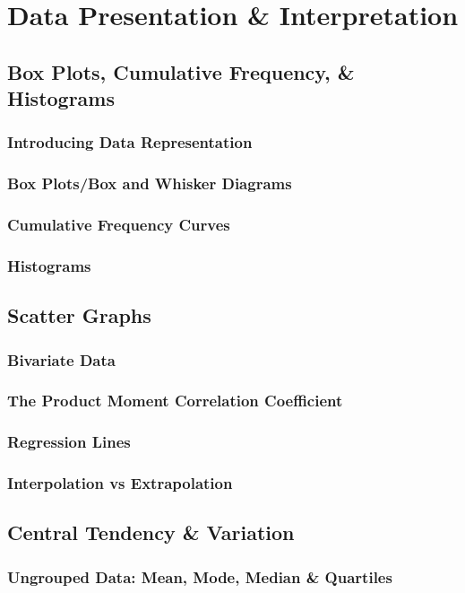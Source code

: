 \documentclass[../maths.tex]{subfiles}
\begin{document}
\chapter{Data Presentation \& Interpretation}
\section{Box Plots, Cumulative Frequency, \& Histograms}
\subsection*{Introducing Data Representation}
\subsection*{Box Plots/Box and Whisker Diagrams}
\subsection*{Cumulative Frequency Curves}
\subsection*{Histograms}
\section{Scatter Graphs}
\subsection*{Bivariate Data}
\subsection*{The Product Moment Correlation Coefficient}
\subsection*{Regression Lines}
\subsection*{Interpolation vs Extrapolation}
\section{Central Tendency \& Variation}
\subsection*{Ungrouped Data: Mean, Mode, Median \& Quartiles}
\end{document}
